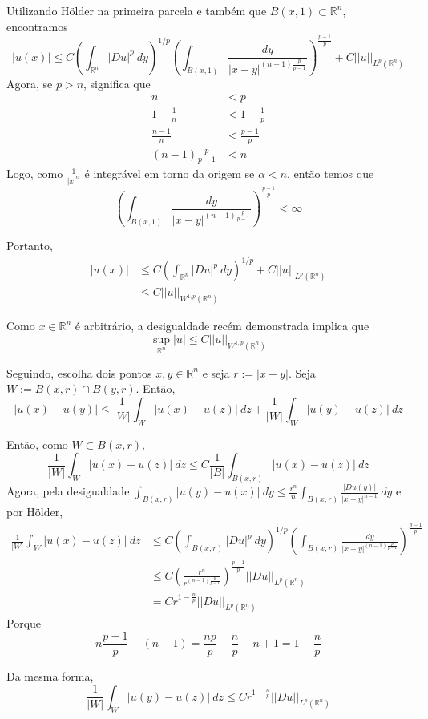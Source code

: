 \documentclass[11pt]{article}
\newcommand{\Rn}{{\mathbb{R}^n}}
\newcommand{\rn}{{\mathbb{R}^n}}
\begin{document}
Utilizando Hölder na primeira parcela e também que $B(x,1) \subset \Rn$, encontramos \[ |u(x)| \leq C \left(\int_\Rn |Du|^p \ dy \right)^{1/p}      \left(  \int_{B(x,1)} \frac{dy}{|x-y|^{(n-1)\frac{p}{p-1}}}  \right)^{\frac{p-1}{p}}      + C ||u||_{L^p(\Rn)} \] Agora, se $p>n$, significa que \begin{align*}	n &< p \\
	1 - \tfrac{1}{n} &< 1 - \tfrac{1}{p} \\
	\frac{n-1}{n} &< \frac{p-1}{p}	\\
	(n-1)\frac{p}{p-1} &< n
\end{align*} Logo, como $ \frac{1}{|x|^\alpha} $ é integrável em torno da origem se $\alpha<n$, então temos que \[ \left(  \int_{B(x,1)} \frac{dy}{|x-y|^{(n-1)\frac{p}{p-1}}}  \right)^{\frac{p-1}{p}}< \infty \]

Portanto, \begin{align*}
	|u(x)| &\leq C \left(\int_\Rn |Du|^p \ dy \right)^{1/p}          + C ||u||_{L^p(\Rn)} \\
	&\leq C ||u||_{W^{1,p}(\Rn)}
\end{align*}

Como $x \in \rn$ é arbitrário, a desigualdade recém demonstrada implica que \[ \sup_{\rn} |u| \leq C ||u||_{W^{1,p}(\rn)} \]



Seguindo, escolha dois pontos $x,y \in \rn$ e seja $r:= |x-y|$. Seja $W:= B(x,r) \cap B(y,r)$. Então, \[ |u(x) - u(y)| \leq \frac{1}{|W|}\int_W |u(x) -u(z)|\ dz + \frac{1}{|W|} \int_W |u(y) - u(z)| \ dz\]

Então, como $W \subset B(x,r)$, \[ \frac{1}{|W|} \int_W |u(x) - u(z)| \ dz \leq C \frac{1}{|B|} \int_{B(x,r)} |u(x) - u(z)|\ dz \] Agora, pela desigualdade $ \int_{ B(x,r)} | u(y) - u(x) |\ dy \leq \frac{r^n}{n} \int_{B(x,r)} \frac{|Du(y)|}{|x-y|^{n-1}}\ dy  $ e por Hölder, \begin{align*}
	 \frac{1}{|W|} \int_W |u(x) - u(z)| \ dz &\leq C \left(\int_{B(x,r)} |Du|^p \ dy \right)^{1/p}      \left(  \int_{B(x,r)} \frac{dy}{|x-y|^{(n-1)\frac{p}{p-1}}}  \right)^{\frac{p-1}{p}} \\
	 &\leq C \left( \frac{r^n}{r^{(n-1)\frac{p}{p-1}}}\right)^{\frac{p-1}{p}} ||Du||_{L^p(\rn)} \\
	 &= Cr^{1-\frac{n}{p}} ||Du||_{L^p(\rn)}
\end{align*} Porque \[ n\frac{p-1}{p} - (n-1) = \frac{np}{p} - \frac{n}{p} -n + 1 = 1 - \frac{n}{p}\]

Da mesma forma, \[ \frac{1}{|W|} \int_W |u(y) - u(z)| \ dz \leq C r^{1-\frac{n}{p}} ||Du||_{L^p(\rn)} \]
\end{document}
